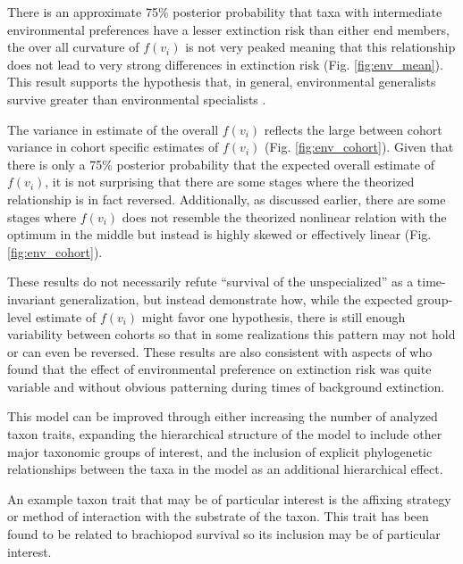 \documentclass[12pt,letterpaper]{article}
\begin{document}
There is an approximate 75\% posterior probability that taxa with intermediate environmental preferences have a lesser extinction risk than either end members, the over all curvature of \(f(v_{i})\) is not very peaked meaning that this relationship does not lead to very strong differences in extinction risk (Fig. \ref{fig:env_mean}). This result supports the hypothesis that, in general, environmental generalists survive greater than environmental specialists \citep{Simpson1944,Liow2004a,Liow2007b,Nurnberg2013a,Nurnberg2015}.

The variance in estimate of the overall \(f(v_{i})\) reflects the large between cohort variance in cohort specific estimates of \(f(v_{i})\) (Fig. \ref{fig:env_cohort}). Given that there is only a 75\% posterior probability that the expected overall estimate of \(f(v_{i})\), it is not surprising that there are some stages where the theorized relationship is in fact reversed. Additionally, as discussed earlier, there are some stages where \(f(v_{i})\) does not resemble the theorized nonlinear relation with the optimum in the middle but instead is highly skewed or effectively linear (Fig. \ref{fig:env_cohort}). 

These results do not necessarily refute ``survival of the unspecialized'' as a time-invariant generalization, but instead demonstrate how, while the expected group-level estimate of \(f(v_{i})\) might favor one hypothesis, there is still enough variability between cohorts so that in some realizations this pattern may not hold or can even be reversed. These results are also consistent with aspects of \citet{Miller2009a} who found that the effect of environmental preference on extinction risk was quite variable and without obvious patterning during times of background extinction.


This model can be improved through either increasing the number of analyzed taxon traits, expanding the hierarchical structure of the model to include other major taxonomic groups of interest, and the inclusion of explicit phylogenetic relationships between the taxa in the model as an additional hierarchical effect.

An example taxon trait that may be of particular interest is the affixing strategy or method of interaction with the substrate of the taxon. This trait has been found to be related to brachiopod survival \citep{Alexander1977} so its inclusion may be of particular interest.
\end{document}
